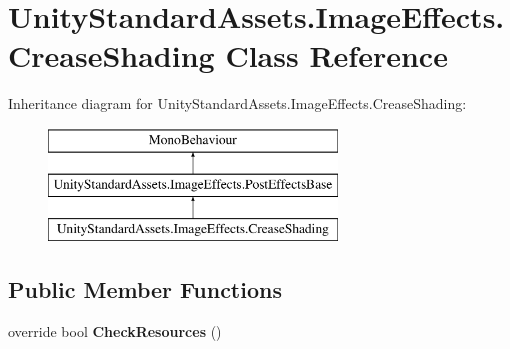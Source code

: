 \hypertarget{class_unity_standard_assets_1_1_image_effects_1_1_crease_shading}{}\section{Unity\+Standard\+Assets.\+Image\+Effects.\+Crease\+Shading Class Reference}
\label{class_unity_standard_assets_1_1_image_effects_1_1_crease_shading}
Inheritance diagram for Unity\+Standard\+Assets.\+Image\+Effects.\+Crease\+Shading\+:\begin{figure}[H]
\begin{center}
\leavevmode
\includegraphics[height=3.000000cm]{class_unity_standard_assets_1_1_image_effects_1_1_crease_shading}
\end{center}
\end{figure}
\subsection*{Public Member Functions}
\begin{DoxyCompactItemize}
\item 
override bool {\bfseries Check\+Resources} ()\hypertarget{class_unity_standard_assets_1_1_image_effects_1_1_crease_shading_a66866d2b64013cd8e1931a9d0e19f101}{}\label{class_unity_standard_assets_1_1_image_effects_1_1_crease_shading_a66866d2b64013cd8e1931a9d0e19f101}

\end{DoxyCompactItemize}
